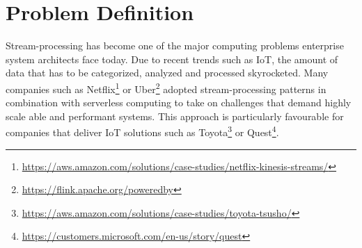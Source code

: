 \section{Problem Definition}

Stream-processing has become one of the major computing problems enterprise system architects face today. Due to recent trends such as IoT, the amount of data that has to be categorized, analyzed and processed skyrocketed. 
Many companies such as Netflix\footnote{\url{https://aws.amazon.com/solutions/case-studies/netflix-kinesis-streams/}} or Uber\footnote{\url{https://flink.apache.org/poweredby}} adopted stream-processing patterns in combination with serverless computing to take on challenges that demand highly scale able and performant systems. 
This approach is particularly favourable for companies that deliver IoT solutions such as Toyota\footnote{\url{https://aws.amazon.com/solutions/case-studies/toyota-tsusho/}} or Quest\footnote{\url{https://customers.microsoft.com/en-us/story/quest}}.